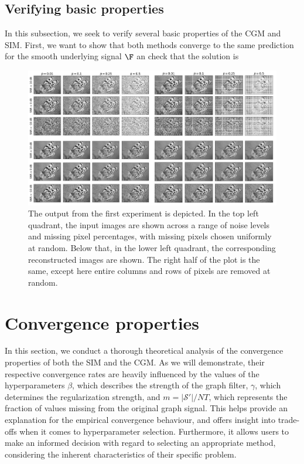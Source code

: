 \subsection{Verifying basic properties}

In this subsection, we seek to verify several basic properties of the CGM and SIM. First, we want to show that both methods converge to the same prediction for the smooth underlying signal $\F$ an check that the solution is 


\begin{figure}[t]
    \hypertarget{butterflies}{}
    \label{fig:butterflies}
    \begin{center}
        \includegraphics[width=0.95\linewidth]{Figures/butterflies.jpg}
    \end{center}
    \caption{\small{The output from the first experiment is depicted. In the top left quadrant, the input images are shown across a range of noise levels and missing pixel percentages, with missing pixels chosen uniformly at random. Below that, in the lower left quadrant, the corresponding reconstructed images are shown. The right half of the plot is the same, except here entire columns and rows of pixels are removed at random.}}
\end{figure}


\section{Convergence properties}

\label{sec:convergence}

In this section, we conduct a thorough theoretical analysis of the convergence properties of both the SIM and the CGM. As we will demonstrate, their respective convergence rates are heavily influenced by the values of the hyperparameters $\beta$, which describes the strength of the graph filter, $\gamma$, which determines the regularization strength, and $m=|\mathcal{S}'|/NT$, which represents the fraction of values missing from the original graph signal. This helps provide an explanation for the empirical convergence behaviour, and offers insight into trade-offs when it comes to hyperparameter selection. Furthermore, it allows users to make an informed decision with regard to selecting an appropriate method, considering the inherent characteristics of their specific problem. 

